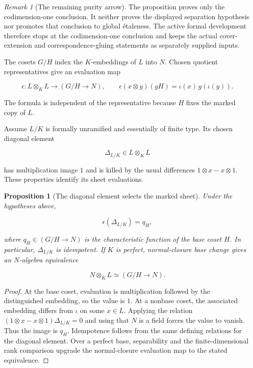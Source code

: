 \documentclass[11pt]{article}
\newtheorem{proposition}[theorem]{Proposition}
\theoremstyle{definition}
\theoremstyle{remark}
\newtheorem*{remark}{Remark}
\begin{document}
\begin{remark}[The remaining purity arrow]
The proposition proves only the codimension-one conclusion.  It neither
proves the displayed separation hypothesis nor promotes that conclusion to
global \'etaleness.  The active formal development therefore stops at the
codimension-one conclusion and keeps the actual cover-extension and
correspondence-gluing statements as separately supplied inputs.
\end{remark}

The cosets \(G/H\) index the \(K\)-embeddings of \(L\) into \(N\).  Chosen
quotient representatives give an evaluation map

\begin{equation}
\label{eq:collision-sheet-evaluation}
  \epsilon:L\otimes_KL\longrightarrow (G/H\to N),
  \qquad
  \epsilon(x\otimes y)(gH)=\iota(x)\,g(\iota(y)).
\end{equation}

The formula is independent of the representative because \(H\) fixes the
marked copy of \(L\).

Assume \(L/K\) is formally unramified and essentially of finite type.  Its
chosen diagonal element

\[
  \Delta_{L/K}\in L\otimes_KL
\]

has multiplication image \(1\) and is killed by the usual differences
\(1\otimes x-x\otimes1\).  These properties identify its sheet evaluations.

\begin{proposition}[The diagonal element selects the marked sheet]
\label{prop:diagonal-selector}
Under the hypotheses above,

\[
  \epsilon(\Delta_{L/K})=q_H,
\]

where \(q_H\in (G/H\to N)\) is the characteristic function of the base coset
\(H\).  In particular, \(\Delta_{L/K}\) is idempotent.  If \(K\) is perfect,
normal-closure base change gives an \(N\)-algebra equivalence

\[
  N\otimes_KL\simeq (G/H\to N).
\]
\end{proposition}

\begin{proof}
At the base coset, evaluation is multiplication followed by the distinguished
embedding, so the value is \(1\).  At a nonbase coset, the associated
embedding differs from \(\iota\) on some \(x\in L\).  Applying the relation
\((1\otimes x-x\otimes1)\Delta_{L/K}=0\) and using that \(N\) is a field
forces the value to vanish.  Thus the image is \(q_H\).  Idempotence follows
from the same defining relations for the diagonal element.  Over a perfect
base, separability and the finite-dimensional rank comparison upgrade the
normal-closure evaluation map to the stated equivalence.
\end{proof}
\end{document}
